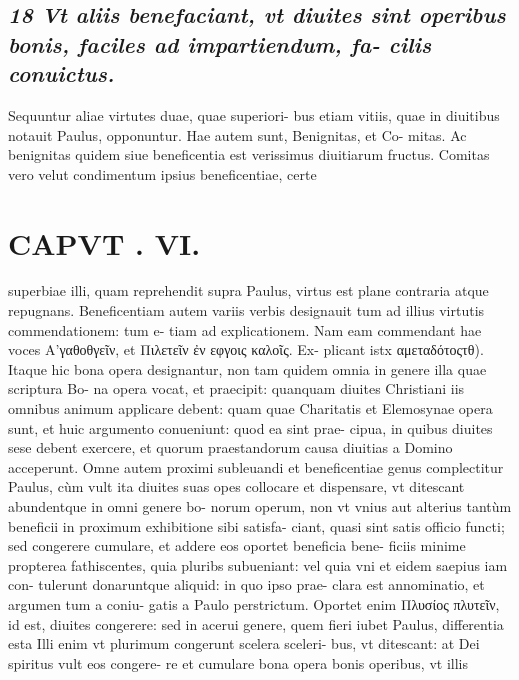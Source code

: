 \documentclass{article}
\begin{document}
\begin{pages}
\subsection*{\textit{18 Vt aliis benefaciant, vt diuites sint operibus bonis, faciles ad impartiendum, fa- cilis conuictus. }}\pstart Sequuntur aliae virtutes duae, quae superiori- bus etiam vitiis, quae in diuitibus notauit Paulus, opponuntur. Hae autem sunt, Benignitas, et Co- mitas. Ac benignitas quidem siue beneficentia est verissimus diuitiarum fructus. Comitas vero velut condimentum ipsius beneficentiae, certe  \pend
\section*{CAPVT . VI. }
\marginpar{[ p.501 ]}\pstart superbiae illi, quam reprehendit supra Paulus, virtus est plane contraria atque repugnans.  \pend\pstart Beneficentiam autem variis verbis designauit tum ad illius virtutis commendationem: tum e- tiam ad explicationem. Nam eam commendant hae voces Α'γαθοθγεῖν, et Πιλετεῖν ἐν εφγοις καλοῖς. Ex- plicant istx αμεταδότοςτθ).  \pend\pstart Itaque hic bona opera designantur, non tam quidem omnia in genere illa quae scriptura Bo- na opera vocat, et praecipit: quanquam diuites Christiani iis omnibus animum applicare debent: quam quae Charitatis et Elemosynae opera sunt, et huic argumento conueniunt: quod ea sint prae- cipua, in quibus diuites sese debent exercere, et quorum praestandorum causa diuitias a Domino acceperunt. Omne autem proximi subleuandi et beneficentiae genus complectitur Paulus, cùm vult ita diuites suas opes collocare et dispensare, vt ditescant abundentque in omni genere bo- norum operum, non vt vnius aut alterius tantùm beneficii in proximum exhibitione sibi satisfa- ciant, quasi sint satis officio functi; sed congerere cumulare, et addere eos oportet beneficia bene- ficiis minime propterea fathiscentes, quia pluribs subueniant: vel quia vni et eidem saepius iam con- tulerunt donaruntque aliquid: in quo ipso prae- clara est annominatio, et argumen tum a coniu- gatis a Paulo perstrictum. Oportet enim Πλυσίος πλυτεῖν, id est, diuites congerere: sed in acerui genere, quem fieri iubet Paulus, differentia esta Illi enim vt plurimum congerunt scelera sceleri- bus, vt ditescant: at Dei spiritus vult eos congere- re et cumulare bona opera bonis operibus, vt illis  \pend

\end{pages}
\end{document}
